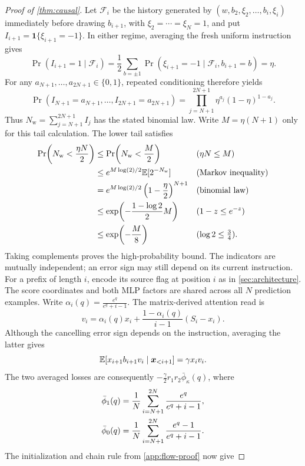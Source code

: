 \begin{proof}[Proof of \cref{thm:causal}]
Let $\mathcal F_i$ be the history generated by $(w,b_2,\xi_2,\ldots,b_i,\xi_i)$ immediately before drawing $b_{i+1}$,
with $\xi_2=\cdots=\xi_N=1$, and put $I_{i+1}=\mathbf 1\{\xi_{i+1}=-1\}$.
In either regime, averaging the fresh uniform instruction gives
\[
 \Pr(I_{i+1}=1\mid\mathcal F_i)
 =\frac{1}{2}\sum_{b=\pm1}\Pr(\xi_{i+1}=-1\mid\mathcal F_i,b_{i+1}=b)=\eta.
\]
For any $a_{N+1},\ldots,a_{2N+1}\in\{0,1\}$, repeated conditioning therefore yields
\[
 \Pr(I_{N+1}=a_{N+1},\ldots,I_{2N+1}=a_{2N+1})
 =\prod_{j=N+1}^{2N+1}\eta^{a_j}(1-\eta)^{1-a_j}.
\]
Thus $N_{\mathrm w}=\sum_{j=N+1}^{2N+1}I_j$ has the stated binomial law.
Write $M=\eta(N+1)$ only for this tail calculation. The lower tail satisfies
\begin{align*}
 \Pr\!\left(N_{\mathrm w}<\frac{\eta N}{2}\right)
 &\le \Pr\!\left(N_{\mathrm w}<\frac{M}{2}\right)&&\text{($\eta N\le M$)}\\
 &\le e^{M\log(2)/2}\mathbb E[2^{-N_{\mathrm w}}]&&\text{(Markov inequality)}\\
 &=e^{M\log(2)/2}\left(1-\frac{\eta}{2}\right)^{N+1}&&\text{(binomial law)}\\
 &\le\exp\!\left(-\frac{1-\log 2}{2}M\right)&&\text{($1-z\le e^{-z}$)}\\
 &\le\exp\!\left(-\frac{M}{8}\right)&&\text{($\log2\le\tfrac34$)}.
\end{align*}
Taking complements proves the high-probability bound.
The indicators are mutually independent; an error sign may still depend on its current instruction.
For a prefix of length $i$, encode its source flag at position $i$ as in \cref{sec:architecture}.
The score coordinates and both MLP factors are shared across all $N$ prediction examples.
Write $\alpha_i(q)=\tfrac{e^q}{e^q+i-1}$. The matrix-derived attention read is
\[
 v_i=\alpha_i(q)x_i+\frac{1-\alpha_i(q)}{i-1}(S_i-x_i).
\]
Although the cancelling error sign depends on the instruction, averaging the latter gives
\[
 \mathbb E[x_{i+1}b_{i+1}v_i\mid\bm x_{<i+1}]=\gamma x_i v_i.
\]
The two averaged losses are consequently $-\tfrac{\gamma}{2}r_1r_2\bar \phi_\kappa(q)$, where
\begin{align}
 \bar \phi_1(q)&=\frac{1}{N}\sum_{i=N+1}^{2N}\frac{e^q}{e^q+i-1},\notag\\
 \bar \phi_0(q)&=\frac{1}{N}\sum_{i=N+1}^{2N}\frac{e^q-1}{e^q+i-1}.
 \label{eq:causal-flow-functions}
\end{align}
The initialization and chain rule from \cref{app:flow-proof} now give

\end{proof}
